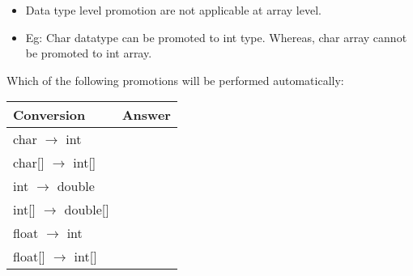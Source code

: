 \setlength{\columnsep}{3pt}
\begin{flushleft}
	\bigskip
	

	\begin{itemize}
		\item Data type level promotion are not applicable at array level.
		\item Eg: Char datatype can be promoted to int type. Whereas, char array cannot be promoted to int array.
		
	\end{itemize}
	
	Which of the following promotions will be performed automatically:
	
	\begin{tabulary}{1.0\textwidth}{|p{12em}|p{12em}|}
		\toprule
		\textbf{Conversion} & \textbf{Answer} \\
		\midrule
		char $\rightarrow$ int & \cmark \\
		\hline
		char[] $\rightarrow$ int[] & \xmark \\
		\hline
		int $\rightarrow$ double & \cmark \\
		\hline
		int[] $\rightarrow$ double[] & \xmark \\
		\hline
		float $\rightarrow$ int & \xmark \\
		\hline
		float[] $\rightarrow$ int[] & \xmark \\
  		\bottomrule
	\end{tabulary}
	
\end{flushleft}
